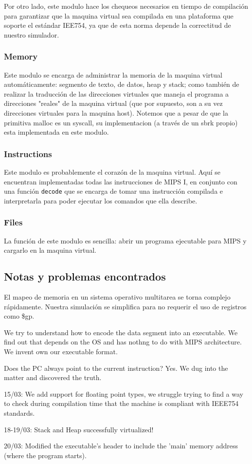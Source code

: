 \documentclass[12pt]{article}
\begin{document}
Por otro lado, este modulo hace los chequeos necesarios en tiempo de compilación para garantizar que la maquina virtual sea compilada en una plataforma que soporte el estándar IEE754, ya que de esta norma depende la correctitud de nuestro simulador.

\subsubsection{Memory}

Este modulo se encarga de administrar la memoria de la maquina virtual automáticamente: segmento de texto, de datos, heap y stack; como también de realizar la traducción de las direcciones virtuales que maneja el programa a direcciones "reales" de la maquina virtual (que por supuesto, son a su vez direcciones virtuales para la maquina host). Notemos que a pesar de que la primitiva malloc es un syscall, su implementacion (a través de un sbrk propio) esta implementada en este modulo.

\subsubsection{Instructions}

Este modulo es probablemente el corazón de la maquina virtual. Aquí se encuentran implementadas todas las instrucciones de MIPS I, en conjunto con una función \texttt{decode} que se encarga de tomar una instrucción compilada e interpretarla para poder ejecutar los comandos que ella describe. 

\subsubsection{Files}

La función de este modulo es sencilla: abrir un programa ejecutable para MIPS y cargarlo en la maquina virtual.


\subsection{Notas y problemas encontrados}

	El mapeo de memoria en un sistema operativo multitarea se torna complejo rápidamente. Nuestra simulación se simplifica para no requerir el uso de registros como \$gp. %

	We try to understand how to encode the data segment into an executable. We find out that depends on the OS and has nothng to do with MIPS architecture. We invent own our executable format.

	Does the PC always point to the current instruction? Yes. We dug into the matter and discovered the truth.

15/03:
	We add support for floating point types, we struggle trying to find a way to check during compilation time that the machine is compliant with IEEE754 standards.

18-19/03:
    Stack and Heap successfully virtualized!

20/03:
	Modified the executable's header to include the 'main' memory address (where the program starts).
\end{document}
